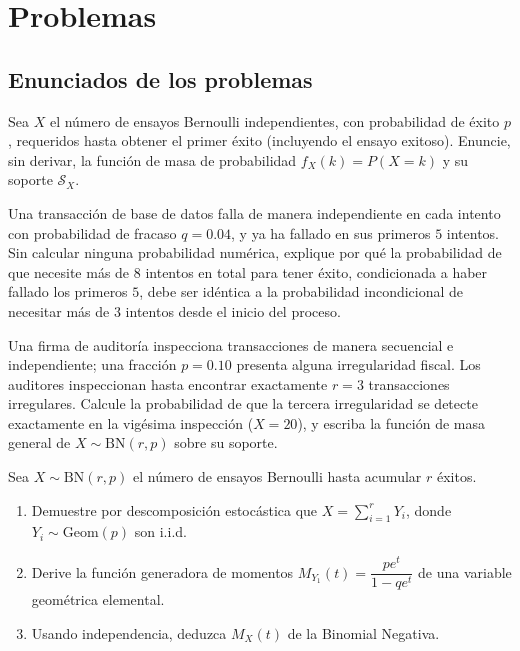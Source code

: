 \section*{Problemas}

\subsection*{Enunciados de los problemas}

\begin{problema}
	\label{prob:287fdc5}
	Sea $X$ el número de ensayos Bernoulli independientes, con probabilidad de éxito $p$, requeridos hasta obtener el primer éxito (incluyendo el ensayo exitoso). Enuncie, sin derivar, la función de masa de probabilidad $f_X(k) = P(X=k)$ y su soporte $\mathcal{S}_X$.
\end{problema}

\begin{problema}
	\label{prob:0ebda90}
	Una transacción de base de datos falla de manera independiente en cada intento con probabilidad de fracaso $q=0.04$, y ya ha fallado en sus primeros $5$ intentos. Sin calcular ninguna probabilidad numérica, explique por qué la probabilidad de que necesite más de $8$ intentos en total para tener éxito, condicionada a haber fallado los primeros $5$, debe ser idéntica a la probabilidad incondicional de necesitar más de $3$ intentos desde el inicio del proceso.
\end{problema}

\begin{problema}
	\label{prob:6ccfa13}
	Una firma de auditoría inspecciona transacciones de manera secuencial e independiente; una fracción $p=0.10$ presenta alguna irregularidad fiscal. Los auditores inspeccionan hasta encontrar exactamente $r=3$ transacciones irregulares. Calcule la probabilidad de que la tercera irregularidad se detecte exactamente en la vigésima inspección ($X=20$), y escriba la función de masa general de $X \sim \text{BN}(r,p)$ sobre su soporte.
\end{problema}

\begin{problema}
	\label{prob:a4a72f3}
	Sea $X \sim \text{BN}(r,p)$ el número de ensayos Bernoulli hasta acumular $r$ éxitos.
	\begin{enumerate}
		\item Demuestre por descomposición estocástica que $X = \sum_{i=1}^r Y_i$, donde $Y_i \sim \text{Geom}(p)$ son i.i.d.
		\item Derive la función generadora de momentos $M_{Y_1}(t) = \dfrac{pe^t}{1-qe^t}$ de una variable geométrica elemental.
		\item Usando independencia, deduzca $M_X(t)$ de la Binomial Negativa.
	\end{enumerate}
\end{problema}

